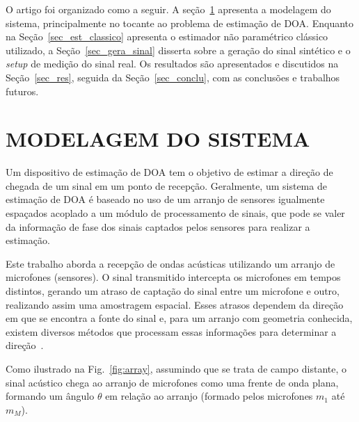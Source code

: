 \documentclass{sbrt2017port}
\begin{document}
O artigo foi organizado como a seguir. A seção~\ref{sec_modelagem} apresenta a modelagem do sistema, principalmente no tocante ao problema de estimação de DOA. Enquanto na Seção~\ref{sec_est_classico} apresenta o estimador não paramétrico clássico utilizado, a Seção~\ref{sec_gera_sinal} disserta sobre a geração do sinal sintético e o \textit{setup} de medição do sinal real. Os resultados são apresentados e discutidos na Seção~\ref{sec_res}, seguida da Seção~\ref{sec_conclu}, com as conclusões e trabalhos futuros.	 


\section{MODELAGEM DO SISTEMA}	
\label{sec_modelagem}
Um dispositivo de estimação de DOA tem o objetivo de estimar a direção de chegada de um sinal em um ponto de recepção. Geralmente,  um sistema de estimação de DOA é baseado no uso de um arranjo de sensores igualmente espaçados acoplado a um módulo de processamento de sinais, que pode se valer da informação de fase dos sinais captados pelos sensores para realizar a estimação.

Este trabalho aborda a recepção de ondas acústicas utilizando um arranjo de microfones (sensores). O sinal transmitido intercepta os microfones em tempos distintos, gerando um atraso de captação do sinal entre um microfone e outro, realizando assim uma amostragem espacial. Esses atrasos dependem da direção em que se encontra a fonte do sinal e, para um arranjo com geometria conhecida, existem diversos métodos que processam essas informações para determinar a direção~\cite{Yuan2008DFTArray}.

Como ilustrado na Fig.~\ref{fig:array}, assumindo que se trata de campo distante, o sinal acústico chega ao arranjo de microfones como uma frente de onda plana, formando um ângulo $\theta$ em relação ao arranjo (formado pelos microfones $m_{1}$ até $m_{M}$).
\end{document}
